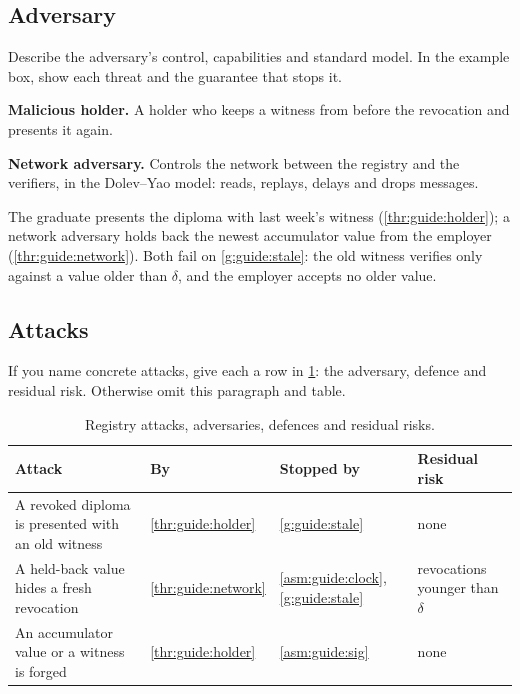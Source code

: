 \subsection[Adversary]{Adversary\skimmark}\label{app:chapters:adversary}
Describe the adversary's control, capabilities and standard model. In the example box, show each threat and the guarantee that stops it.
\begin{threats}
  \item\label{thr:guide:holder} \textbf{Malicious holder.} A holder who keeps a witness from before the revocation and presents it again.
  \item\label{thr:guide:network} \textbf{Network adversary.} Controls the network between the registry and the verifiers, in the Dolev--Yao model: reads, replays, delays and drops messages.
\end{threats}
\begin{runningexample}
The graduate presents the diploma with last week's witness (\cref{thr:guide:holder}); a network adversary holds back the newest accumulator value from the employer (\cref{thr:guide:network}). Both fail on \cref{g:guide:stale}: the old witness verifies only against a value older than $\delta$, and the employer accepts no older value.
\end{runningexample}

\subsection[Attacks]{Attacks\skimmark}\label{app:chapters:attacks}
If you name concrete attacks, give each a row in \cref{tab:guide:attacks}: the adversary, defence and residual risk. Otherwise omit this paragraph and table.
\begin{table}[!ht]
  \centering
  \caption{Registry attacks, adversaries, defences and residual risks.}
  \label{tab:guide:attacks}
  {\small
  \begin{tabularx}{\linewidth}{>{\raggedright\arraybackslash}X l >{\raggedright\arraybackslash}X >{\raggedright\arraybackslash}X}
    \toprule
    \textbf{Attack} & \textbf{By} & \textbf{Stopped by} & \textbf{Residual risk} \\
    \midrule
    A revoked diploma is presented with an old witness & \cref{thr:guide:holder} & \cref{g:guide:stale} & none \\
    A held-back value hides a fresh revocation & \cref{thr:guide:network} & \cref{asm:guide:clock}, \cref{g:guide:stale} & revocations younger than $\delta$ \\
    An accumulator value or a witness is forged & \cref{thr:guide:holder} & \cref{asm:guide:sig} & none \\
    \bottomrule
  \end{tabularx}
  }
\end{table}


